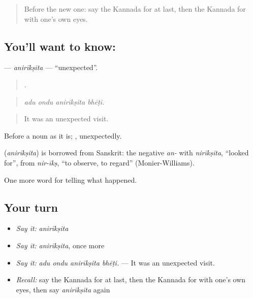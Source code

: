 \label{lesson:KA-C369-aniriksita}



\begin{quote}
Before the new one: say the Kannada for at last, then the Kannada for with one's own eyes.
\end{quote}

\subsection*{You'll want to know: }
\textbf{} — \emph{anirīkṣita} — \textquotedblleft{}unexpected\textquotedblright{}.

\begin{quote}
   .
\end{quote}

\begin{quote}
\emph{adu ondu anirīkṣita bhēṭi.}
\end{quote}

\begin{quote}
It was an unexpected visit.
\end{quote}

Before a noun as it is; , unexpectedly.

\begin{cousinweb}
\textbf{} (\emph{anirīkṣita}) is borrowed from Sanskrit: the negative \emph{an-} with \emph{nirīkṣita}, \textquotedblleft{}looked for\textquotedblright{}, from \emph{nir-īkṣ}, \textquotedblleft{}to observe, to regard\textquotedblright{} (Monier-Williams).
\end{cousinweb}

\begin{grammarlens}[title={What you've built}]
One more word for telling what happened.
\end{grammarlens}

\subsection*{Your turn}
\begin{itemize}
\raggedright
  \item \emph{Say it:} \emph{anirīkṣita}
  \item \emph{Say it:} \emph{anirīkṣita}, once more
  \item \emph{Say it:} \emph{adu ondu anirīkṣita bhēṭi.} — It was an unexpected visit.
  \item \emph{Recall:} say the Kannada for at last, then the Kannada for with one's own eyes, then say \emph{anirīkṣita} again
\end{itemize}

